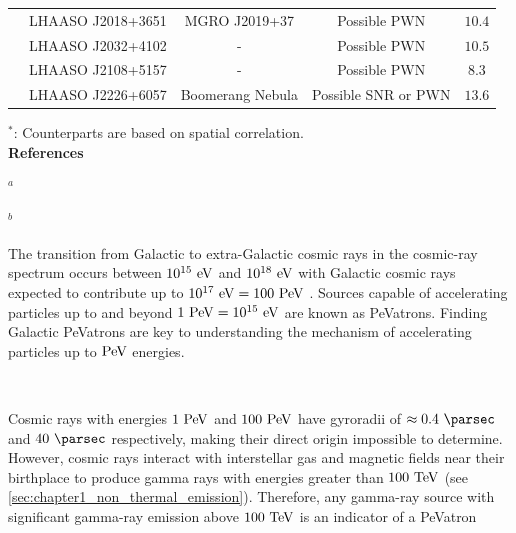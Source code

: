 \begin{table}[h!]
{\begin{threeparttable}
\begin{tabular}{ccccc}
         & LHAASO J2018+3651 & MGRO J2019+37  & Possible PWN & $10.4$ \\
         & LHAASO J2032+4102 & - & Possible PWN & $10.5$ \\
         & LHAASO J2108+5157 & - & Possible PWN & $8.3$ \\
         & LHAASO J2226+6057 & Boomerang Nebula & Possible SNR or PWN & $13.6$ \\
         \hline
    \end{tabular}
    \begin{tablenotes}
	\item $^*$: Counterparts are based on spatial correlation.  \\
	\textbf{References}
	\item $^{a}$ \cite{2018APS..APRB17003B} 
	\item $^{b}$ \cite{2015MNRAS.449.3827K} 
    \end{tablenotes}
    \end{threeparttable}
    }
\end{table}
The transition from Galactic to extra-Galactic cosmic rays in the cosmic-ray spectrum occurs between $10^{15}~\si{\electronvolt}$ and $10^{18}~\si{\electronvolt}$ with Galactic cosmic rays expected to contribute up to $10^{17}~\eV=100~\PeV$ \citep{2016A&A...595A..33T}. Sources capable of accelerating particles up to and beyond $1~\PeV=10^{15}~\eV$ are known as PeVatrons. Finding Galactic PeVatrons are key to understanding the mechanism of accelerating particles up to $\PeV$ energies.
\par~\par
Cosmic rays with energies $1~\PeV$ and $100~\PeV$ have gyroradii of $\approx 0.4~\pc$ and $40~\pc$ respectively, making their direct origin impossible to determine. However, cosmic rays interact with interstellar gas and magnetic fields near their birthplace to produce gamma rays with energies greater than $100~\TeV$ (see \autoref{sec:chapter1_non_thermal_emission}). Therefore, any gamma-ray source with significant gamma-ray emission above $100~\TeV$ is an indicator of a PeVatron
\par~\par 
